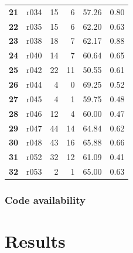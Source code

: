 \documentclass[10pt]{article}
\begin{document}
\begin{tabular}{|l|l|r|r|r|r|}
\textbf{21} &  r034 &  15 &          6 &     57.26 &               0.80 \\ 
\textbf{22} &  r035 &  15 &          6 &     62.20 &               0.63 \\ 
\textbf{23} &  r038 &  18 &          7 &     62.17 &               0.88 \\ 
\textbf{24} &  r040 &  14 &          7 &     60.64 &               0.65 \\ 
\textbf{25} &  r042 &  22 &         11 &     50.55 &               0.61 \\ 
\textbf{26} &  r044 &   4 &          0 &     69.25 &               0.52 \\ 
\textbf{27} &  r045 &   4 &          1 &     59.75 &               0.48 \\ 
\textbf{28} &  r046 &  12 &          4 &     60.00 &               0.47 \\ 
\textbf{29} &  r047 &  44 &         14 &     64.84 &               0.62 \\
\textbf{30} &  r048 &  43 &         16 &     65.88 &               0.66 \\ 
\textbf{31} &  r052 &  32 &         12 &     61.09 &               0.41 \\ 
\textbf{32} &  r053 &   2 &          1 &     65.00 &               0.63 \\ 
\hline
\end{tabular}





\subsubsection*{Code availability}

\section{Results}
\end{document}
